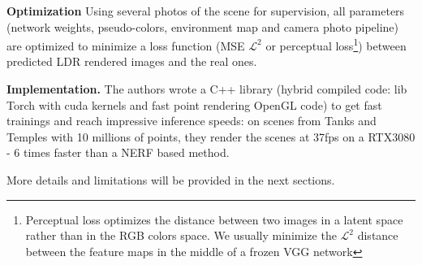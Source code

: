 \noindent \textbf{Optimization} Using several photos of the scene for supervision, all parameters (network weights, pseudo-colors, environment map and camera photo pipeline) are optimized to minimize a loss function (MSE $\mathcal{L}^{2}$ or perceptual loss\footnote{Perceptual loss \cite{johnson2016perceptual} optimizes the distance between two images in a latent space rather than in the RGB colors space. We usually minimize the $\mathcal{L}^{2}$ distance between the feature maps in the middle of a frozen VGG network}) between predicted LDR rendered images and the real ones. 

\noindent\textbf{Implementation.} The authors wrote a C++ library (hybrid compiled code: lib Torch with cuda kernels and fast point rendering OpenGL code) to get fast trainings and reach impressive inference speeds: on scenes from Tanks and Temples \cite{Knapitsch2017TanksAndTemples} with 10 millions of points, they render the scenes at 37fps on a RTX3080 - 6 times faster than a NERF based method.

More details and limitations will be provided in the next sections.
